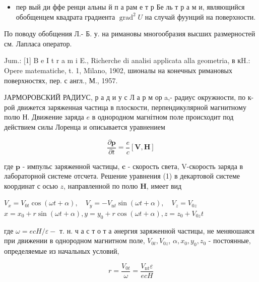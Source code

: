 \documentclass[10pt]{article}
\begin{document}
\begin{itemize}

  \item пер вый ди ффе ренци альны й п а рам е т р Бе ль т р а м и, являющийся обобщенцем квадрата градиента $\operatorname{grad}^{2} U$ на случай фуунций на поверхности.

\end{itemize}



По поводу обобщения Л.- Б. у. на римановы многообразия высших размерностей см. Лапласа оператор.



Jum.: [1] B e I t r a m i E., Richerche di analisi applicata alla geometria, в кH.: Opere matematiche, t. 1, Milano, 1902, шионалы на конечных римановых поверхностях, пер. с англ., М., 1957.



ЈАРМОРОВСКИЙ РАДИУС, р а д и у с Л а р м ор a,- радиус окружности, по к-рой движется заряженная частица в плоскости, перпендикулярной магнитному полю Н. Движение заряда $e$ в однородном магнітном поле происходит под действием силы Лоренца и описывается уравнением



\[

\frac{\partial \boldsymbol{p}}{\partial t}=\frac{e}{c}[\boldsymbol{V}, \boldsymbol{H}]

\]



где $\boldsymbol{p}$ - импульс заряженной частицы, $\boldsymbol{c}$ - скорость света, V-скорость заряда в лабораторной системе отсчета. Решение уравнения (1) в декартовой системе координат с осью $z$, направленной по полю $\boldsymbol{H}$, имеет вид



$V_{x}=V_{0 t} \cos (\omega t+\alpha), \quad V_{y}=-V_{\mathrm{n} t} \sin (\omega t+\alpha), \quad V_{z}=V_{0 z}$ $x=x_{0}+r \sin (\omega t+\alpha), y=y_{0}+r \cos (\omega t+\alpha), z=z_{0}+V_{0 z} t$



где $\omega=e c H / \varepsilon-$ т. н. ч а с т о т а әнергия заряженной частицы, не меняюшаяся при движении в однородном магнитном поле, $V_{0 t}, V_{0 z}$, $\alpha, x_{0}, y_{0}, z_{0}$ - постоянные, определяемые из начальных условий,



\[

r=\frac{V_{0 t}}{\omega}=\frac{V_{\mathrm{nt}} \varepsilon}{e c H}

\]
\end{document}
